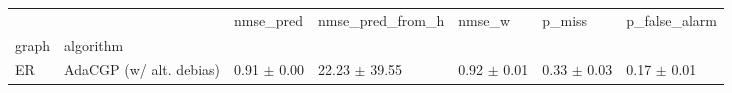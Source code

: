 \begin{tabular}{lllllll}
\toprule
   &                         &        nmse_pred &   nmse_pred_from_h &           nmse_w &           p_miss &    p_false_alarm \\
graph & algorithm &                  &                    &                  &                  &                  \\
\midrule
ER & AdaCGP (w/ alt. debias) &  0.91 $\pm$ 0.00 &  22.23 $\pm$ 39.55 &  0.92 $\pm$ 0.01 &  0.33 $\pm$ 0.03 &  0.17 $\pm$ 0.01 \\
\bottomrule
\end{tabular}
